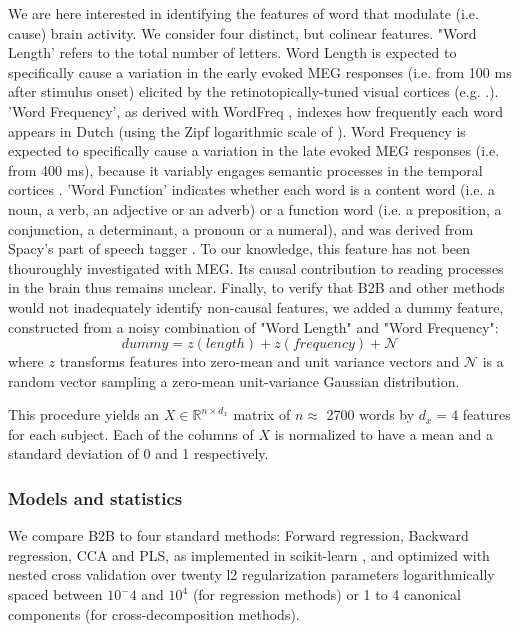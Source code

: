 We are here interested in identifying the features of word that modulate (i.e. cause) brain activity. We consider four distinct, but colinear features.
%
"Word Length' refers to the total number of letters. Word Length is expected to specifically cause a variation in the early evoked MEG responses (i.e. from 100 ms after stimulus onset) elicited by the retinotopically-tuned visual cortices (e.g. \citep{pegado2014timing}.).
%
'Word Frequency', as derived with WordFreq \citep{speerwordfreq}, indexes how frequently each word appears in Dutch (using the Zipf logarithmic scale of \citep{van2014subtlex}). Word Frequency is expected to specifically cause a variation in the late evoked MEG responses (i.e. from 400 ms), because it variably engages semantic processes in the temporal cortices \citep{kutas2011thirty}.
%
'Word Function' indicates whether each word is a content word (i.e. a noun, a verb, an adjective or an adverb) or a function word (i.e. a preposition, a conjunction, a determinant, a pronoun or a numeral), and was derived from Spacy's part of speech tagger \citep{spacy2}. To our knowledge, this feature has not been thouroughly investigated with MEG. Its causal contribution to reading processes in the brain thus remains unclear.
%
Finally, to verify that B2B and other methods would not inadequately identify non-causal features, we added a dummy feature, constructed from a noisy combination of "Word Length" and "Word Frequency":
\begin{equation}
  dummy = z(length) + z(frequency) + \mathcal{N}
\end{equation}
where $z$ transforms features into zero-mean and unit variance vectors and $\mathcal{N}$ is a random vector sampling a zero-mean unit-variance Gaussian distribution.

This procedure yields an $X \in \mathbb{R}^{n \times d_x}$ matrix of $n\approx$ 2700 words by
$d_x=4$ features for each subject. Each of the columns of $X$ is normalized to
have a mean and a standard deviation of 0 and 1 respectively.

\subsubsection{Models and statistics}

We compare B2B to four standard methods: Forward regression, Backward regression, CCA and PLS, as implemented in scikit-learn \citep{scikit}, and optimized with nested cross validation over twenty l2 regularization parameters logarithmically spaced between $10^-4$ and $10^4$ (for regression methods) or 1 to 4 canonical components (for cross-decomposition methods).

